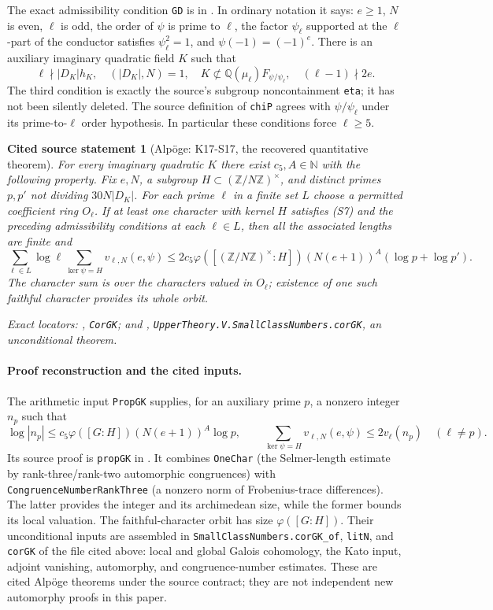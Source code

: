 \documentclass[11pt,a4paper]{article}
\newtheorem{sourcefact}[theorem]{Cited source statement}
\theoremstyle{definition}
\begin{document}
The exact admissibility condition \texttt{GD} is in
. In ordinary notation it says:
$e\ge1$, $N$ is even, $\ell$ is odd, the order of $\psi$ is prime to
$\ell$, the factor $\psi_\ell$ supported at the $\ell$-part of the
conductor satisfies $\psi_\ell^2=1$, and
$\psi(-1)=(-1)^e$. There is an auxiliary imaginary quadratic field $K$
such that
\[
 \ell\nmid |D_K|h_K,\quad (|D_K|,N)=1,\quad
 K\not\subset\mathbb Q(\mu_\ell)F_{\psi/\psi_\ell},\quad
 (\ell-1)\nmid2e. \tag{S7}
\]
The third condition is exactly the source's subgroup noncontainment
\texttt{eta}; it has not been silently deleted. The source definition
of \texttt{chiP} agrees with $\psi/\psi_\ell$ under its prime-to-$\ell$
order hypothesis. In particular these conditions force $\ell\ge5$.

\begin{sourcefact}[Alp\"oge: K17-S17, the recovered quantitative theorem]
For every imaginary quadratic $K$ there exist $c_5,A\in\mathbb N$ with
the following property. Fix $e,N$, a subgroup
$H\subset(\mathbb Z/N\mathbb Z)^\times$, and distinct primes $p,p'$
not dividing $30N|D_K|$. For each prime $\ell$ in a finite set $L$ choose
a permitted coefficient ring $O_\ell$. If at least one character with
kernel $H$ satisfies (S7) and the preceding admissibility conditions at
each $\ell\in L$, then all the associated lengths are finite and
\[
 \sum_{\ell\in L}\log\ell
   \sum_{\ker\psi=H}v_{\ell,N}(e,\psi)
 \le 2c_5\varphi([(\mathbb Z/N\mathbb Z)^\times:H])
          (N(e+1))^A(\log p+\log p'). \tag{S8}
\]
The character sum is over the characters valued in $O_\ell$; existence
of one such faithful character provides its whole orbit.

Exact locators: ,
\texttt{CorGK}; and ,
\texttt{UpperTheory.V.SmallClassNumbers.corGK}, an unconditional theorem.
\end{sourcefact}

\paragraph{Proof reconstruction and the cited inputs.}
The arithmetic input \texttt{PropGK} supplies, for an auxiliary prime $p$,
a nonzero integer $n_p$ such that
\[
 \log|n_p|\le c_5\varphi([G:H])(N(e+1))^A\log p,
 \qquad
 \sum_{\ker\psi=H}v_{\ell,N}(e,\psi)\le2v_\ell(n_p)
 \quad(\ell\ne p). \tag{S9}
\]
Its source proof is \texttt{propGK} in
. It combines
\texttt{OneChar} (the Selmer-length estimate by rank-three/rank-two
automorphic congruences) with \texttt{CongruenceNumberRankThree}
(a nonzero norm of Frobenius-trace differences). The latter provides the
integer and its archimedean size, while the former bounds its local
valuation. The faithful-character orbit has size $\varphi([G:H])$.
Their unconditional inputs are assembled in
\texttt{SmallClassNumbers.corGK\_of}, \texttt{litN}, and \texttt{corGK}
of the file cited above: local and global Galois cohomology, the Kato
input, adjoint vanishing, automorphy, and congruence-number estimates.
These are cited Alp\"oge theorems under the source contract; they are
not independent new automorphy proofs in this paper.
\end{document}
